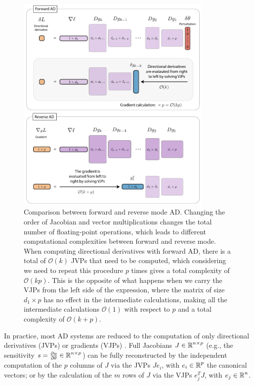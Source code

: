 \begin{figure}[p]
    \centering
    \includegraphics[width=0.85\textwidth]{figures/AD-VJPJVP.pdf}
    \caption{Comparison between forward and reverse mode AD. Changing the order of Jacobian and vector multiplications changes the total number of floating-point operations, which leads to different computational complexities between forward and reverse mode. When computing directional derivatives with forward AD, there is a total of $\mathcal O (k)$ JVPs that need to be computed, which considering we need to repeat this procedure $p$ times gives a total complexity of $\mathcal O (kp)$. This is the opposite of what happens when we carry the VJPs from the left side of the expression, where the matrix of size $d_1 \times p$ has no effect in the intermediate calculations, making all the intermediate calculations $\mathcal O (1)$ with respect to $p$ and a total complexity of $\mathcal O (k + p)$. }
    \label{fig:vjp-jvp}
\end{figure}

In practice, most AD systems are reduced to the computation of only directional derivatives (JVPs) or gradients (VJPs) \cite{Griewank:2008kh}.
Full Jacobians $J \in \operatorname{\mathbb{R}}^{n \times p}$ (e.g., the sensitivity $s = \frac{\partial u}{\partial \theta} \in \operatorname{\mathbb{R}}^{n \times p}$) can be fully reconstructed by the independent computation of the $p$ columns of $J$ via the JVPs $J e_i$, with $e_i \in \operatorname{\mathbb{R}}^p$ the canonical vectors; or by the calculation of the $m$ rows of $J$ via the VJPs $e_j^T J$, with $e_j \in \operatorname{\mathbb{R}}^n$.

